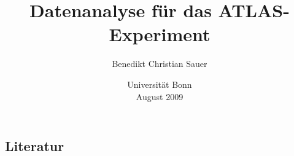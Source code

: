 \documentclass[a4paper,oneside]{scrartcl}
\author{Benedikt Christian Sauer}
\title{Datenanalyse für das ATLAS-Experiment}
\begin{document}
    \begin{titlepage}
        \date{\vspace{1cm} Universität Bonn \\ August 2009}
    \end{titlepage}
\maketitle
\newpage
\tableofcontents
\newpage





\begin{appendix}
  \section{Literatur}
  \begin{biblist}
  \end{biblist}
\end{appendix}
\end{document}
